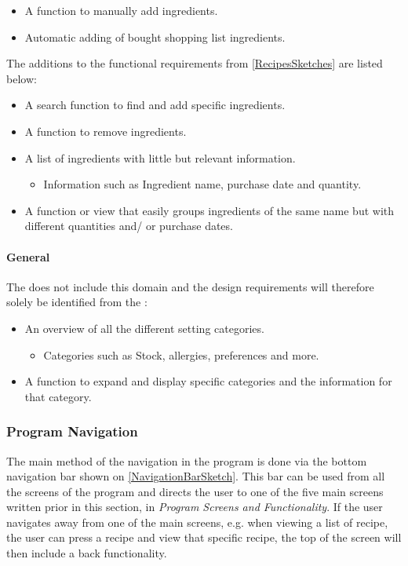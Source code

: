 \begin{itemize}
	\item A function to manually add ingredients.
	\item Automatic adding of bought shopping list ingredients.
\end{itemize}

The additions to the functional requirements from  \cref{RecipesSketches} are listed below:

\begin{itemize}
	\item A search function to find and add specific ingredients.
	\item A function to remove ingredients.
	\item A list of ingredients with little but relevant information.
		\begin{itemize}
			\item Information such as Ingredient name, purchase date and quantity.
		\end{itemize}
	\item A function or view that easily groups ingredients of the same name but with different quantities and/ or purchase dates.
\end{itemize}  

\paragraph{General}   
The  does not include this domain and the design requirements will therefore solely be identified from the :

\begin{itemize}
	\item An overview of all the different setting categories.
		\begin{itemize}
			\item Categories such as Stock, allergies, preferences and more.
		\end{itemize}
	\item A function to expand and display specific categories and the information for that category.
\end{itemize} 
 
\subsubsection{Program Navigation}
The main method of the navigation in the program is done via the bottom navigation bar shown on \cref{NavigationBarSketch}. This bar can be used from all the screens of the program and directs the user to one of the five main screens written prior in this section, in \textit{Program Screens and Functionality}. If the user navigates away from one of the main screens, e.g. when viewing a list of recipe, the user can press a recipe and view that specific recipe, the top of the screen will then include a back functionality. 

